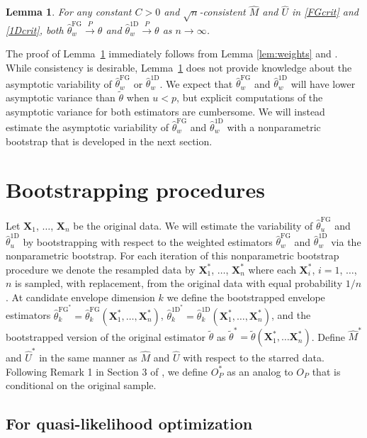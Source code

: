 \documentclass{article}\usepackage[]{graphicx}\usepackage[]{color}
\newcommand{\Mhat}{\widehat{M}}
\newcommand{\Mstar}{\widehat{M}^{\textstyle{*}}}
\newcommand{\Uhat}{\widehat{U}}
\newcommand{\Ustar}{\widehat{U}^{\textstyle{*}}}
\newcommand{\TFG}{\widehat{\theta}^{\text{FG}}}
\newcommand{\TD}{\widehat{\theta}^{\text{1D}}}
\newcommand{\Ttil}{\widetilde{\theta}}
\newcommand{\TstarFG}{\widehat{\theta}^{{\text{FG}}^{\textstyle{*}}}}
\newcommand{\TstarD}{\widehat{\theta}^{{\text{1D}}^{\textstyle{*}}}}
\newcommand{\Ttilstar}{\widetilde{\theta}^{\textstyle{*}}}
\newcommand{\EnvwFG}{\widehat{\theta}^{\text{FG}}_w}
\newcommand{\EnvwoneD}{\widehat{\theta}^{\text{1D}}_w}
\newcommand{\X}{\mathbf{X}}
\newcommand{\Xstar}{\X^{\textstyle{*}}}
\newtheorem{lem}{Lemma}
\begin{document}
\begin{lem}
For any constant $C > 0$ and $\sqrt{n}$-consistent $\Mhat$ and $\Uhat$ in \eqref{FGcrit} and \eqref{1Dcrit}, both $\EnvwFG \overset{P}{\to} \theta$ and $\EnvwoneD \overset{P}{\to} \theta$ as $n \to \infty$.
\label{lem:envcon}
\end{lem}

The proof of Lemma~\ref{lem:envcon} immediately follows from Lemma \ref{lem:weights} and \citet[Proposition 2.1]{zhangmai}. While consistency is desirable, Lemma~\ref{lem:envcon} does not provide knowledge about the asymptotic variability of $\EnvwFG$ or $\EnvwoneD$. %
We expect that $\EnvwFG$ and $\EnvwoneD$ will have lower asymptotic variance than $\Ttil$ when $u < p$, but explicit computations of the asymptotic variance for both estimators are cumbersome. We will instead estimate the asymptotic variability of $\EnvwFG$ and $\EnvwoneD$ with a nonparametric bootstrap that is developed in the next section. 

\section{Bootstrapping procedures}
\label{sec:boot}

Let $\X_1$, $\ldots$, $\X_n$ be the original data. We will estimate the variability of $\TFG_u$ and $\TD_u$ by bootstrapping with respect to the weighted estimators $\TFG_w$ and $\TD_w$ via the nonparametric bootstrap. For each iteration of this nonparametric bootstrap procedure we denote the resampled data by $\Xstar_1$, $\ldots$, $\Xstar_n$ where each $\Xstar_i$, $i = 1$, $\ldots$, $n$ is sampled, with replacement, from the original data with equal probability $1/n$. At candidate envelope dimension $k$ we define the bootstrapped envelope estimators $\TstarFG_k = \TFG_k\left(\Xstar_1, \ldots, \Xstar_n\right)$, $\TstarD_k = \TD_k\left(\Xstar_1, \ldots, \Xstar_n\right)$, and the bootstrapped version of the original estimator $\Ttil$ as $\Ttilstar = \Ttil(\Xstar_1, \ldots \Xstar_n)$. Define $\Mstar$ and $\Ustar$ in the same manner as $\Mhat$ and $\Uhat$ with respect to the starred data. Following Remark 1 in Section 3 of \cite{chang2003sieve}, we define $O_P^{\textstyle{*}}$ as an analog to $O_P$ that is conditional on the original sample.

\subsection{For quasi-likelihood optimization}
\label{sec:bootFG}
\end{document}
